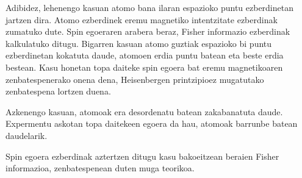 Adibidez, lehenengo kasuan atomo bana ilaran espazioko puntu ezberdinetan jartzen dira.
Atomo ezberdinek eremu magnetiko intentzitate ezberdinak zumatuko dute.
Spin egoeraren arabera beraz, Fisher informazio ezberdinak kalkulatuko ditugu.
Bigarren kasuan atomo guztiak espazioko bi puntu ezberdinetan kokatuta daude, atomoen erdia puntu batean eta beste erdia bestean.
Kasu honetan topa daiteke spin egoera bat eremu magnetikoaren zenbatespenerako onena dena, Heisenbergen printzipioez mugatutako zenbatespena lortzen duena.

Azkenengo kasuan, atomoak era desordenatu batean zakabanatuta daude.
Expermentu askotan topa daitekeen egoera da hau, atomoak barrunbe batean daudelarik.

Spin egoera ezberdinak aztertzen ditugu kasu bakoeitzean beraien Fisher informazioa, zenbatespenean duten muga teorikoa.
